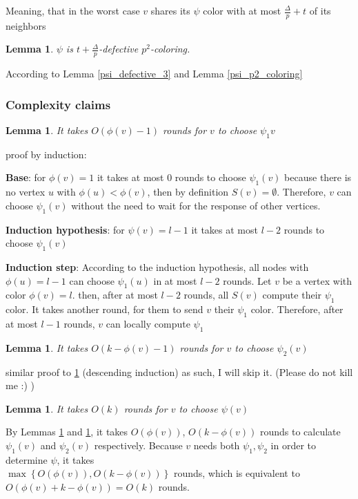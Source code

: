 \documentclass[11pt]{article}
\newtheorem{lemma}[theorem]{Lemma}
\begin{document}
Meaning, that in the worst case $v$ shares its $\psi$ color with at most $\frac{\Delta}{p} + t$ of its neighbors


\begin{lemma}
$\psi$ is $t+\frac{\Delta}{p}$-defective $p^2$-coloring.
\end{lemma}
According to Lemma \ref{psi_defective_3} and Lemma \ref{psi_p2_coloring}

\subsubsection*{Complexity claims}

\begin{lemma}
\label{psi_1_rounds}
It takes $O(\phi(v) -1)$ rounds for $v$ to choose $\psi_1{v}$
\end{lemma}
proof by induction: 

\textbf{Base}: for $\phi(v)=1$ it takes at most 0 rounds to choose $\psi_1(v)$
because there is no vertex $u$ with $\phi(u) < \phi(v)$, then by definition $S(v)=\emptyset$. Therefore, $v$ can choose $\psi_1(v)$ without the need to wait for the response of other vertices.

\textbf{Induction hypothesis}: for $\psi(v)=l-1$ it takes at most $l-2$ rounds to choose $\psi_1(v)$

\textbf{Induction step}: According to the induction hypothesis, all nodes with $\phi(u)=l-1$ can choose $\psi_1(u)$ in at most $l-2$ rounds. Let $v$ be a vertex with color $\phi(v)=l$. then, after at most $l-2$ rounds, all $S(v)$ compute their $\psi_1$ color. It takes another round, for them to send $v$ their $\psi_1$ color. Therefore, after at most $l-1$ rounds, $v$ can locally compute $\psi_1$

\begin{lemma}
\label{psi_2_rounds}
It takes $O(k -\phi(v) -1 )$ rounds for $v$ to choose $\psi_2(v)$
\end{lemma}
similar proof to \ref{psi_1_rounds} (descending induction) as such, I will skip it. (Please do not kill me :) )

\begin{lemma}
\label{psi_rounds}
It takes $O(k)$ rounds for $v$ to choose $\psi(v)$
\end{lemma}
By Lemmas \ref{psi_1_rounds} and \ref{psi_2_rounds}, it takes $O(\phi(v))$, $O(k- \phi(v))$  rounds to calculate $\psi_1(v)$ and $\psi_2(v)$ respectively. Because $v$ needs both $\psi_1, \psi_2$ in order to determine $\psi$, it takes \\
$\max \left\{ O(\phi(v)), O(k- \phi(v)) \right\}$
rounds, which is equivalent to $O(\phi(v) + k- \phi(v))=O(k)$ rounds.
\end{document}
